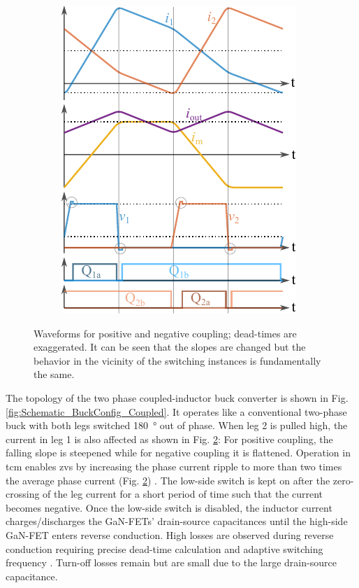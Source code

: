 \documentclass{IPEC2026}
\newcommand{\ac}{\gls}
\begin{document}
\begin{figure}
\begin{subfigure}[c]{0.48\columnwidth}
      \includegraphics[width=\textwidth]{figures/Inkscape/Waveforms_positive.pdf}
      \label{fig:waveform_posCoupling}
    \end{subfigure}
  \caption{Waveforms for positive and negative coupling; dead-times are exaggerated. It can be seen that the slopes are changed but the behavior in the vicinity of the switching instances is fundamentally the same.}
  \label{fig:waveform_Coupling}
\end{figure}
The topology of the two phase coupled-inductor buck converter is shown in Fig. \ref{fig:Schematic_BuckConfig_Coupled}. It operates like a conventional two-phase buck with both legs switched \qty{180}{\degree} out of phase. When leg 2 is pulled high, the current in leg 1 is also affected as shown in Fig. \ref{fig:waveform_Coupling}: For positive coupling, the falling slope is steepened while for negative coupling it is flattened. 
Operation in \ac{tcm} enables \ac{zvs} by increasing the phase current ripple to more than two times the average phase current (Fig. \ref{fig:waveform_Coupling}) \cite{henzeZerovoltageSwitchingHigh1988}. The low-side switch is kept on after the zero-crossing of the leg current for a short period of time such that the current becomes negative. Once the low-side switch is disabled, the inductor current charges/discharges the GaN-FETs' drain-source capacitances until the high-side GaN-FET enters reverse conduction. High losses are observed during reverse conduction requiring precise dead-time calculation and adaptive switching frequency \cite{haiderAnalyticalCalculationResidual2021}. Turn-off losses remain but are small due to the large drain-source capacitance. 
\end{document}
